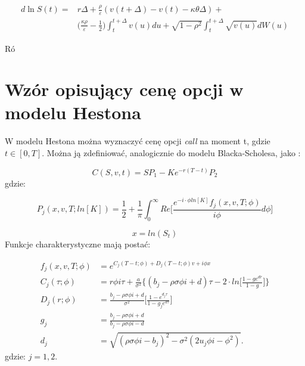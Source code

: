 \documentclass{pracamgr}
\begin{document}
\begin{equation}
\begin{aligned}
\label{eq:HestonLnSDiscretization}
d \ln S(t) = & r \Delta + \frac{\rho}{\varepsilon} (v(t + \Delta)  - v(t) - \kappa \theta \Delta) + \\
& \Big( \frac{\kappa \rho}{\varepsilon} - \frac{1}{2} \Big)
\int_t^{t+\Delta} v(u) du + \sqrt{1-\rho^2} \int_t^{t+\Delta} \sqrt{v(u)}dW(u)
\end{aligned}
\end{equation}

Ró


\section{Wzór opisujący cenę opcji w modelu Hestona}

W modelu Hestona można wyznaczyć cenę opcji \textit{call} na moment t, 
gdzie $t \in [0, T]$. Można ją zdefiniować, analogicznie do modelu Blacka-Scholesa, jako 
\cite{Heston}:

\begin{equation}
\label{eq:HestonCharacteristicFirst}
  C(S, v, t) = SP_1 -K e^{-r(T-t)} P_2
\end{equation}
gdzie:

\begin{equation}
\label{eq:HestonProb}
  P_j (x, v, T; ln[K]) = \frac{1}{2} + \frac{1}{\pi} \int_{0}^{\infty} Re \bigg[ \frac{e^{-i \cdot \phi ln[K]} f_j(x, v, T; \phi) }{i \phi} d \phi \bigg]
\end{equation}

\begin{equation}
  x = ln(S_t)
\end{equation}
Funkcje charakterystyczne mają postać: 

\begin{equation}
\label{eq:HestonCharacteristic}
  \begin{aligned}
f_j(x, v, T; \phi) &= e^{C_j(T-t; \phi) + D_j(T-t; \phi)v + i \phi x} \\
C_j (\tau; \phi)     &= r \phi i \tau + \frac{a}{\sigma^2} \bigg\{ (b_j - \rho \sigma \phi i + d) \tau - 2 \cdot ln \bigg[ \frac{1 - ge^{dr}}{1-g} \bigg] \bigg\} \\
D_j (r; \phi)        &= \frac{b_j- \rho \sigma \phi i + d}{\sigma^2} \bigg[ \frac{1 - e^{d_j \tau}}{1 - g_je^{d\tau}} \bigg]   \\
g_j                &= \frac{b_j - \rho \sigma \phi i + d}{b_j - \rho \sigma \phi i - d} \\
d_j                &= \sqrt{(\rho \sigma \phi i  - b_j)^2 - \sigma^2(2 u_j \phi  i  - \phi^2)}.
  \end{aligned}
\end{equation}
gdzie: $j = 1,2$.
\end{document}
